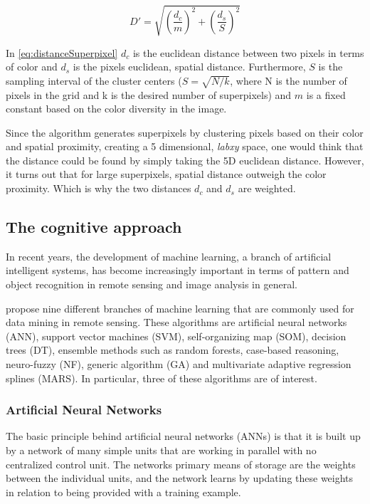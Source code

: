 \begin{equation}
	D'=\sqrt{\left(\frac{d_{c}}{m}\right)^{2} + \left(\frac{d_{s}}{S}\right)^{2}}
	\label{eq:distanceSuperpixel}
\end{equation}

In \autoref{eq:distanceSuperpixel} $d_{c}$ is the euclidean distance between two pixels in terms of color and $d_{s}$ is the pixels euclidean, spatial distance. Furthermore, $S$ is the sampling interval of the cluster centers ($S = \sqrt{N/k}$, where N is the number of pixels in the grid and k is the desired number of superpixels) and $m$ is a fixed constant based on the color diversity in the image.

Since the algorithm generates superpixels by clustering pixels based on their color and spatial proximity, creating a 5 dimensional, \textit{labxy} space, one would think that the distance could be found by simply taking the 5D euclidean distance. However, it turns out that for large superpixels, spatial distance outweigh the color proximity. Which is why the two distances $d_{c}$ and $d_{s}$ are weighted.

\subsection{The cognitive approach}
In recent years, the development of machine learning, a branch of artificial intelligent systems, has become increasingly important in terms of pattern and object recognition in remote sensing and image analysis in general.

\cite{Lary2016} propose nine different branches of machine learning that are commonly used for data mining in remote sensing. These algorithms are artificial neural networks (ANN), support vector machines (SVM), self-organizing map (SOM), decision trees (DT), ensemble methods such as random forests, case-based reasoning, neuro-fuzzy (NF), generic algorithm (GA) and multivariate adaptive regression splines (MARS). In particular, three of these algorithms are of interest.

\subsubsection*{Artificial Neural Networks}
The basic principle behind artificial neural networks (ANNs) is that it is built up by a network of many simple units that are working in parallel with no centralized control unit. The networks primary means of storage are the weights between the individual units, and the network learns by updating these weights in relation to being provided with a training example.

